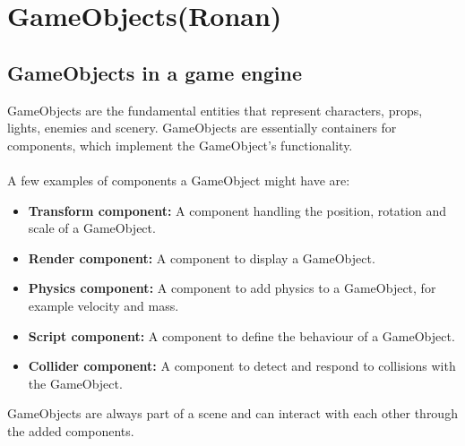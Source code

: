 \section{GameObjects(Ronan)}

\subsection{GameObjects in a game engine}
GameObjects are the fundamental entities that represent characters, props, lights, enemies and scenery.
GameObjects are essentially containers for components, which implement the GameObject's functionality.
\\\\
\noindent A few examples of components a GameObject might have are:
\begin{itemize}
    \item \textbf{Transform component:}
          A component handling the position, rotation and scale of a GameObject.
    \item \textbf{Render component:}
          A component to display a GameObject.
    \item \textbf{Physics component:}
          A component to add physics to a GameObject, for example velocity and mass.
    \item \textbf{Script component:}
          A component to define the behaviour of a GameObject.
    \item \textbf{Collider component:}
          A component to detect and respond to collisions with the GameObject.
\end{itemize}

\noindent GameObjects are always part of a scene and can interact with each other through the added components.

